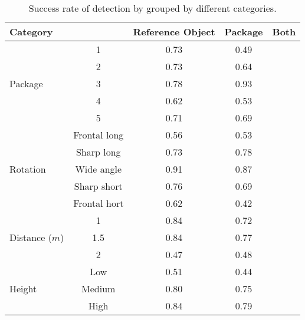 \begin{table}%
\centering
\begin{tabular}{lcccc}
\toprule
\multicolumn{2}{l}{Category} & Reference Object & Package & Both\\
\midrule

\multirow{5}{*}{Package} 
& 1 & 0.73 & 0.49  \\ 
& 2 & 0.73 & 0.64  \\
& 3 & 0.78 & 0.93  \\
& 4 & 0.62 & 0.53  \\
& 5 & 0.71 & 0.69  \\
\midrule

\multirow{5}{*}{Rotation}
& Frontal long		& 0.56 & 0.53  \\ 
& Sharp long		& 0.73 & 0.78  \\
& Wide angle 		& 0.91 & 0.87  \\
& Sharp short 	& 0.76 & 0.69  \\
& Frontal hort		& 0.62 & 0.42  \\
\midrule
\multirow{3}{*}{Distance ($m$)} 
& 1 			& 0.84 & 0.72  \\ 
& 1.5  			& 0.84 & 0.77  \\
& 2 			& 0.47 & 0.48  \\
\midrule
\multirow{3}{*}{Height} 
& Low 		& 0.51 & 0.44 \\ 
& Medium 	& 0.80 & 0.75 \\
& High		& 0.84 & 0.79 \\
\bottomrule
 \end{tabular}
 \caption{Success rate of detection by grouped by different categories.}
\label{table:detection_categories}
\end{table}
